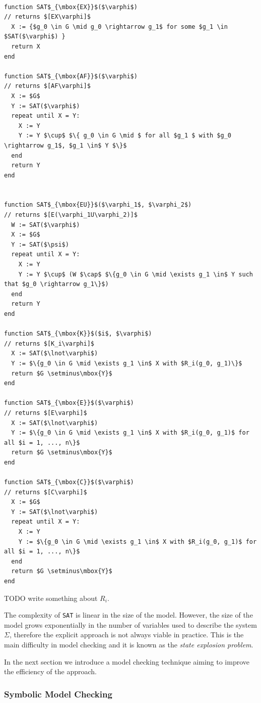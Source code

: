 \documentclass[12]{article}
\begin{document}
\begin{lstlisting}[mathescape]

function SAT$_{\mbox{EX}}$($\varphi$)
// returns $[EX\varphi]$
  X := {$g_0 \in G \mid g_0 \rightarrow g_1$ for some $g_1 \in $SAT($\varphi$) }
  return X
end
 
function SAT$_{\mbox{AF}}$($\varphi$)
// returns $[AF\varphi]$
  X := $G$
  Y := SAT($\varphi$)
  repeat until X = Y:
    X := Y
    Y := Y $\cup$ $\{ g_0 \in G \mid $ for all $g_1 $ with $g_0 \rightarrow g_1$, $g_1 \in$ Y $\}$ 
  end
  return Y
end
  

function SAT$_{\mbox{EU}}$($\varphi_1$, $\varphi_2$)
// returns $[E(\varphi_1U\varphi_2)]$
  W := SAT($\varphi$)
  X := $G$
  Y := SAT($\psi$)
  repeat until X = Y:
    X := Y
    Y := Y $\cup$ (W $\cap$ $\{g_0 \in G \mid \exists g_1 \in$ Y such that $g_0 \rightarrow g_1\}$)
  end
  return Y
end

function SAT$_{\mbox{K}}$($i$, $\varphi$)
// returns $[K_i\varphi]$
  X := SAT($\lnot\varphi$)
  Y := $\{g_0 \in G \mid \exists g_1 \in$ X with $R_i(g_0, g_1)\}$
  return $G \setminus\mbox{Y}$
end

function SAT$_{\mbox{E}}$($\varphi$)
// returns $[E\varphi]$
  X := SAT($\lnot\varphi$)
  Y := $\{g_0 \in G \mid \exists g_1 \in$ X with $R_i(g_0, g_1)$ for all $i = 1, ..., n\}$
  return $G \setminus\mbox{Y}$
end

function SAT$_{\mbox{C}}$($\varphi$)
// returns $[C\varphi]$
  X := $G$
  Y := SAT($\lnot\varphi$)
  repeat until X = Y:
    X := Y
    Y := $\{g_0 \in G \mid \exists g_1 \in$ X with $R_i(g_0, g_1)$ for all $i = 1, ..., n\}$
  end
  return $G \setminus\mbox{Y}$
end

\end{lstlisting}

TODO write something about $R_i$. 

The complexity of \texttt{SAT} is linear in the size of the model. However, the size of the model grows exponentially in the number of variables used to describe the system $\Sigma$, therefore the explicit approach is not always viable in practice. This is the main difficulty in model checking and it is known as the \textit{state explosion problem}. 

In the next section we introduce a model checking technique aiming to improve the efficiency of the approach. 

\subsubsection{Symbolic Model Checking}
\end{document}
